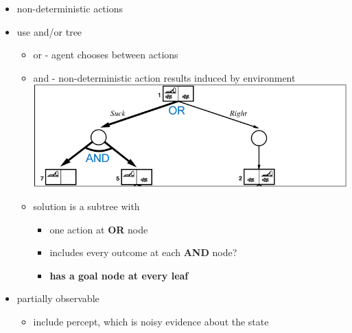 \documentclass[11pt]{article}
\begin{document}
\begin{description}
\begin{itemize}
	\item non-deterministic actions
	\item use and/or tree
	\begin{itemize}
		\item or - agent chooses between actions
		\item and - non-deterministic action results induced by environment
		\\ \includegraphics{and_or}
		\item solution is a subtree with
		\begin{itemize}
			\item one action at \textbf{OR} node
			\item includes every outcome at each \textbf{AND} node?
			\item \textbf{has a goal node at every leaf}
		\end{itemize}
	\end{itemize}

	\item partially observable
	\begin{itemize}
		\item include percept, which is noisy evidence about the state
	\end{itemize}
\end{itemize}


\end{description}
\end{document}
